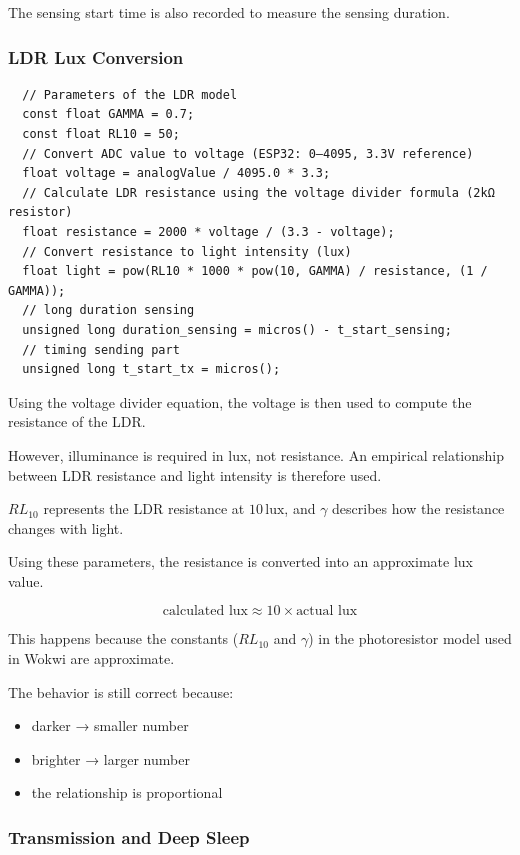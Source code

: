 \documentclass[11pt,a4paper]{article}
\begin{document}
The sensing start time is also recorded to measure the sensing duration.

\subsubsection*{LDR Lux Conversion}

\begin{lstlisting}
  // Parameters of the LDR model
  const float GAMMA = 0.7;
  const float RL10 = 50;
  // Convert ADC value to voltage (ESP32: 0–4095, 3.3V reference)
  float voltage = analogValue / 4095.0 * 3.3;
  // Calculate LDR resistance using the voltage divider formula (2kΩ resistor)
  float resistance = 2000 * voltage / (3.3 - voltage);
  // Convert resistance to light intensity (lux)
  float light = pow(RL10 * 1000 * pow(10, GAMMA) / resistance, (1 / GAMMA));
  // long duration sensing
  unsigned long duration_sensing = micros() - t_start_sensing;
  // timing sending part
  unsigned long t_start_tx = micros();
\end{lstlisting}

Using the voltage divider equation, the voltage is then used to compute the resistance of the LDR.

However, illuminance is required in lux, not resistance. An empirical relationship between LDR resistance and light intensity is therefore used.

$RL_{10}$ represents the LDR resistance at $10\,\text{lux}$, and $\gamma$ describes how the resistance changes with light.

Using these parameters, the resistance is converted into an approximate lux value.

\[
\text{calculated lux} \approx 10 \times \text{actual lux}
\]

This happens because the constants ($RL_{10}$ and $\gamma$) in the photoresistor model used in Wokwi are approximate.

The behavior is still correct because:

\begin{itemize}
\item darker → smaller number
\item brighter → larger number
\item the relationship is proportional
\end{itemize}

\subsubsection*{Transmission and Deep Sleep}
\end{document}

